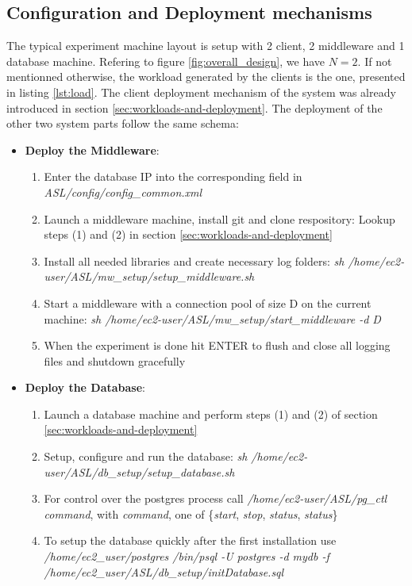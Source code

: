 \documentclass[11pt]{article}
\begin{document}
\subsection{Configuration and Deployment mechanisms}\label{sec:configuration-and-deployment-mechanisms}
The typical experiment machine layout is setup with 2 client, 2 middleware and 1 database machine. Refering to figure \ref{fig:overall_design}, we have $N=2$. If not mentionned otherwise, the workload generated by the clients is the one, presented in listing \ref{lst:load}. The client deployment mechanism of the system was already introduced in section \ref{sec:workloads-and-deployment}. The deployment of the other two system parts follow the same schema:
\begin{itemize}
	\item \textbf{Deploy the Middleware}:
	\begin{enumerate}
		\item Enter the database IP into the corresponding field in \textit{ASL/config/config\_common.xml}
		\item Launch a middleware machine, install git and clone respository: Lookup steps (1) and (2) in section \ref{sec:workloads-and-deployment}
		\item Install all needed libraries and create necessary log folders:\newline
		\textit{sh /home/ec2-user/ASL/mw\_setup/setup\_middleware.sh}
		\item Start a middleware with a connection pool of size D on the current machine:\newline
		\textit{sh /home/ec2-user/ASL/mw\_setup/start\_middleware -d D}
		\item When the experiment is done hit ENTER to flush and close all logging files and shutdown gracefully
	\end{enumerate}
	\item \textbf{Deploy the Database}:
	\begin{enumerate}
		\item Launch a database machine and perform steps (1) and (2) of section \ref{sec:workloads-and-deployment}
		\item Setup, configure and run the database: \newline
		\textit{sh /home/ec2-user/ASL/db\_setup/setup\_database.sh}
		\item For control over the postgres process call \textit{/home/ec2-user/ASL/pg\_ctl command}, with \textit{command}, one of \{\textit{start}, \textit{stop}, \textit{status}, \textit{status}\}
		\item To setup the database quickly after the first installation use \textit{/home/ec2\_user/postgres /bin/psql -U postgres -d mydb -f /home/ec2\_user/ASL/db\_setup/initDatabase.sql}
	\end{enumerate}
\end{itemize}
\end{document}

